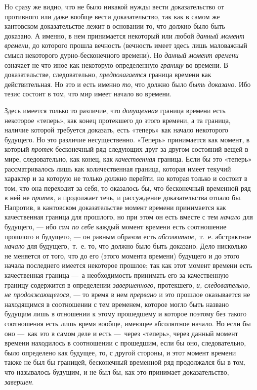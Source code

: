 {Но сразу же видно, что не было никакой нужды вести доказательство от
противного или даже вообще вести доказательство, так как в самом же
кантовском доказательстве лежит в основании то, что должно было быть
доказано. А именно, в нем принимается некоторый или любой
{\em данный момент времени}, до которого прошла
вечность (вечность имеет здесь лишь маловажный смысл некоторого
дурно-бесконечного времени). Но {\em данный момент
времени} означает не что иное как некоторую определенную
{\em границу} во времени. В доказательстве,
следовательно, {\em предполагается} граница времени как
действительная. Но это и есть именно {\em то}, что
должно было {\em быть доказано}. Ибо тезис состоит в
том, что мир имеет начало во времени.

Здесь имеется только то различие, что {\em допущенная}
граница времени есть некоторое «теперь», как конец протекшего до этого
времени, а та граница, наличие которой требуется доказать, есть «теперь»
как начало некоторого будущего. Но это различие несущественно. «Теперь»
принимается как момент, в который {\em протек}
бесконечный ряд следующих друг за другом состояний вещей в мире,
следовательно, как конец, как {\em качественная}
граница. Если бы это «теперь» рассматривалось лишь как количественная
граница, которая имеет текучий характер и за которую не только должно
перейти, но которая только и состоит в том, что она переходит за себя, то
оказалось бы, что бесконечный временной ряд в ней не
{\em протек}, а продолжает течь, и рассуждение
доказательства отпало бы. Напротив, в кантовском доказательстве момент
времени принимается как качественная граница для прошлого, но при этом он
есть вместе с тем {\em начало} для будущего, — ибо
{\em сам по себе} каждый момент времени есть
соотношение прошлого и будущего, — он равным образом есть
{\em абсолютное},~т.~е. абстрактное
{\em начало} для будущего,~т.~е. то, что должно было
быть доказано. Дело нисколько не меняется от того, что до его (этого
момента времени) будущего и до этого начала последнего имеется некоторое
прошлое; так как этот момент времени есть качественная граница —~а
необходимость принимать его за качественную границу содержится в
определении {\em завершенного}, протекшего,
{\em и, следовательно, не продолжающегося}, — то время
в нем {\em прервано} и это прошлое оказывается не
находящимся в соотношении с тем временем, которое могло быть названо
будущим лишь в отношении к этому прошедшему и которое поэтому без такого
соотношения есть лишь время вообще, имеющее абсолютное начало. Но если бы
оно —~как это в самом деле и есть —~через «теперь», через данный момент
времени находилось в соотношении с прошедшим, если бы оно, следовательно,
было определено как будущее, то, с другой стороны, и этот момент времени
также не был бы границей, бесконечный временной ряд продолжался бы в том,
что называлось будущим, и не был бы, как это принимает доказательство,
{\em завершен}.

}
